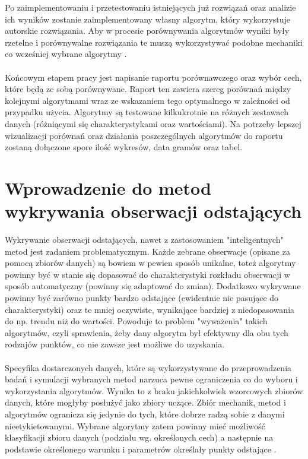 \documentclass[eng,printmode]{mgr}
\begin{document}
Po zaimplementowaniu i przetestowaniu istniejących już rozwiązań oraz analizie ich wyników zostanie zaimplementowany własny algorytm, który wykorzystuje autorskie rozwiązania. Aby w procesie porównywania algorytmów wyniki były rzetelne i porównywalne rozwiązania te muszą wykorzystywać podobne mechaniki co wcześniej wybrane algorytmy \cite{novelty}. 
\\\\
Końcowym etapem pracy jest napisanie raportu porównawczego oraz wybór cech, które będą ze sobą porównywane. Raport ten zawiera szereg porównań między kolejnymi algorytmami wraz ze wskazaniem tego optymalnego w zależności od przypadku użycia. Algorytmy są testowane kilkukrotnie na różnych zestawach danych (różniącymi się charakterystykami oraz wartościami). Na potrzeby lepszej wizualizacji porównań oraz działania poszczególnych algorytmów do raportu zostaną dołączone spore ilość wykresów, data gramów oraz tabel.

\chapter{Wprowadzenie do metod wykrywania obserwacji odstających}
Wykrywanie obserwacji odstających, nawet z zastosowaniem "inteligentnych" metod jest zadaniem problematycznym. Każde zebrane obserwacje (opisane za pomocą zbiorów danych) są bowiem w pewien sposób unikalne, toteż algorytmy powinny być w stanie się dopasować do charakterystyki rozkładu obserwacji w sposób automatyczny (powinny się adaptować do zmian). Dodatkowo wykrywane powinny być zarówno punkty bardzo odstające (ewidentnie nie pasujące do charakterystyki) oraz te mniej oczywiste, wynikające bardziej z niedopasowania do np. trendu niż do wartości. Powoduje to problem "wyważenia" takich algorytmów, czyli sprawienia, żeby dany algorytm był efektywny dla obu tych rodzajów punktów, co nie zawsze jest możliwe do uzyskania.
\\\\
Specyfika dostarczonych danych, które są wykorzystywane do przeprowadzenia badań i symulacji wybranych metod narzuca pewne ograniczenia co do wyboru i wykorzystania algorytmów. Wynika to z braku jakichkolwiek wzorcowych zbiorów danych, które mogłyby posłużyć jako zbiory uczące. Zbiór mechanik, metod i algorytmów ogranicza się jedynie do tych, które dobrze radzą sobie z danymi nieetykietowanymi. Wybrane algorytmy zatem powinny mieć możliwość klasyfikacji zbioru danych (podziału wg. określonych cech) a następnie na podstawie określonego warunku i parametrów określały punkty odstające \cite{outlier-detection-alg}  \cite{outlier-detection-alg-1}.
\end{document}
